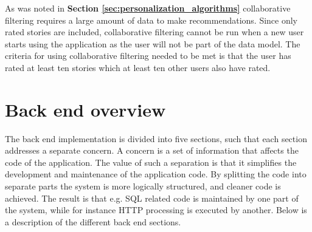 As was noted in \textbf{Section \ref{sec:personalization_algorithms}} collaborative filtering requires a large amount of data to make recommendations. Since only rated stories are included, collaborative filtering cannot be run when a new user starts using the application as the user will not be part of the data model. The criteria for using collaborative filtering needed to be met is that the user has rated at least ten stories which at least ten other users also have rated. 

\section{Back end overview}
The back end implementation is divided into five sections, such that each section addresses a separate concern. A concern is a set of information that affects the code of the application. The value of such a separation is that it simplifies the development and maintenance of the application code. By splitting the code into separate parts the system is more logically structured, and cleaner code is achieved. The result is that e.g. SQL related code is maintained by one part of the system, while for instance HTTP processing is executed by another. Below is a description of the different back end sections.

